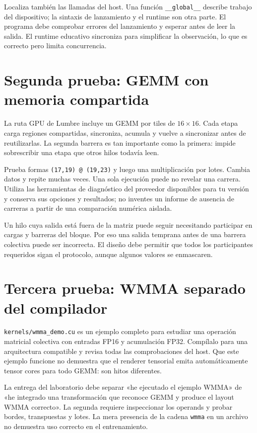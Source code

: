 \documentclass[12pt,a4paper,oneside]{report}
\begin{document}
Localiza también las llamadas del host. Una función \texttt{\_\_global\_\_} describe trabajo del dispositivo; la sintaxis de lanzamiento y el runtime son otra parte. El programa debe comprobar errores del lanzamiento y esperar antes de leer la salida. El runtime educativo sincroniza para simplificar la observación, lo que es correcto pero limita concurrencia.

\section{Segunda prueba: GEMM con memoria compartida}
La ruta GPU de Lumbre incluye un GEMM por tiles de $16\times16$. Cada etapa carga regiones compartidas, sincroniza, acumula y vuelve a sincronizar antes de reutilizarlas. La segunda barrera es tan importante como la primera: impide sobrescribir una etapa que otros hilos todavía leen.

Prueba formas \texttt{(17,19) @ (19,23)} y luego una multiplicación por lotes. Cambia datos y repite muchas veces. Una sola ejecución puede no revelar una carrera. Utiliza las herramientas de diagnóstico del proveedor disponibles para tu versión y conserva sus opciones y resultados; no inventes un informe de ausencia de carreras a partir de una comparación numérica aislada.

Un hilo cuya salida está fuera de la matriz puede seguir necesitando participar en cargas y barreras del bloque. Por eso una salida temprana antes de una barrera colectiva puede ser incorrecta. El diseño debe permitir que todos los participantes requeridos sigan el protocolo, aunque algunos valores se enmascaren.

\section{Tercera prueba: WMMA separado del compilador}
\texttt{kernels/wmma\_demo.cu} es un ejemplo completo para estudiar una operación matricial colectiva con entradas FP16 y acumulación FP32. Compílalo para una arquitectura compatible y revisa todas las comprobaciones del host. Que este ejemplo funcione no demuestra que el renderer tensorial emita automáticamente tensor cores para todo GEMM: son hitos diferentes.

La entrega del laboratorio debe separar «he ejecutado el ejemplo WMMA» de «he integrado una transformación que reconoce GEMM y produce el layout WMMA correcto». La segunda requiere inspeccionar los operands y probar bordes, transpuestas y lotes. La mera presencia de la cadena \texttt{wmma} en un archivo no demuestra uso correcto en el entrenamiento.
\end{document}
